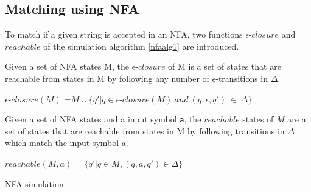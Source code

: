 \subsection{Matching using NFA}
To match if a given string is accepted in an NFA, two functions $\epsilon$-$closure$ and $reachable$ of the simulation algorithm \ref{nfaalg1} are introduced.
\begin{mydef}
Given a set of NFA states M, the $\epsilon $-$ closure$ of M is a set of states that are reachable from states in M by following any number of $\epsilon$-transitions in $\Delta$.
\begin{center}
$\epsilon$-$closure(M)$ =$ M \cup \{q'|q\in \epsilon$-$closure(M) ~and ~(q,\epsilon,q') ~ \in ~ \Delta\}$
\end{center}
\cite[p. 34, def 2.2]{compile}
\end{mydef}

\begin{mydef}
Given a set of NFA states and a input symbol {\tt a}, the $reachable$ states of $M$ are a set of states that are reachable from states in M by following transitions in $\Delta$ which match the input symbol a. 
\begin{center}
$reachable(M,a)$ = $\{q'|q \in M,(q,a,q')\in \Delta \}$
\end{center}
\end{mydef}
\begin{algorithm}
  \caption{NFA simulation}
    \label{nfaalg1}
  \begin{algorithmic}[1]
            \State {}
        \EndIf
      \EndFor
        \State {}
      \EndIf
      \State {}
    \EndFunction
  \end{algorithmic}
\end{algorithm}

